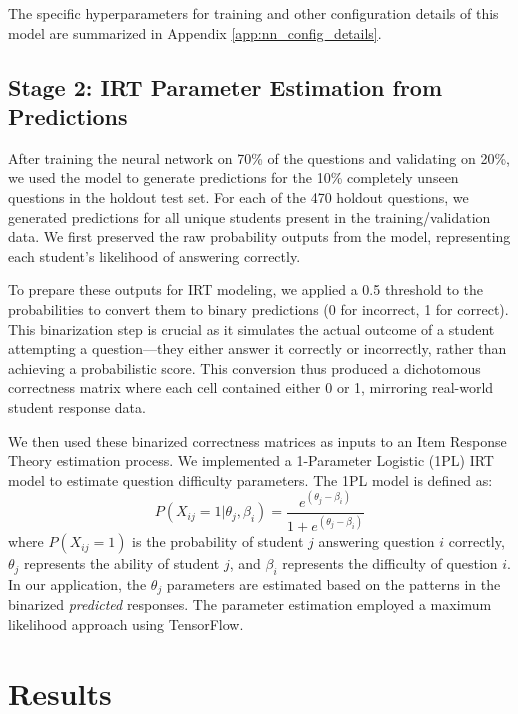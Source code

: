 \documentclass[
    a4paper, %
    10pt, %
    twoside, %
]{LTJournalArticle}
\begin{document}
The specific hyperparameters for training and other configuration details of this model are summarized in Appendix \ref{app:nn_config_details}.

\subsection{Stage 2: IRT Parameter Estimation from Predictions}

After training the neural network on 70\% of the questions and validating on 20\%, we used the model to generate predictions for the 10\% completely unseen questions in the holdout test set. For each of the 470 holdout questions, we generated predictions for all unique students present in the training/validation data. We first preserved the raw probability outputs from the model, representing each student's likelihood of answering correctly.

To prepare these outputs for IRT modeling, we applied a 0.5 threshold to the probabilities to convert them to binary predictions (0 for incorrect, 1 for correct). This binarization step is crucial as it simulates the actual outcome of a student attempting a question—they either answer it correctly or incorrectly, rather than achieving a probabilistic score. This conversion thus produced a dichotomous correctness matrix where each cell contained either 0 or 1, mirroring real-world student response data.

We then used these binarized correctness matrices as inputs to an Item Response Theory estimation process. We implemented a 1-Parameter Logistic (1PL) IRT model to estimate question difficulty parameters. The 1PL model is defined as:
\begin{equation}
P(X_{ij}=1 | \theta_j, \beta_i) = \frac{e^{(\theta_j - \beta_i)}}{1 + e^{(\theta_j - \beta_i)}}
\end{equation}
where $P(X_{ij}=1)$ is the probability of student $j$ answering question $i$ correctly, $\theta_j$ represents the ability of student $j$, and $\beta_i$ represents the difficulty of question $i$. In our application, the $\theta_j$ parameters are estimated based on the patterns in the binarized \textit{predicted} responses.
The parameter estimation employed a maximum likelihood approach using TensorFlow.


\section{Results}
\end{document}

